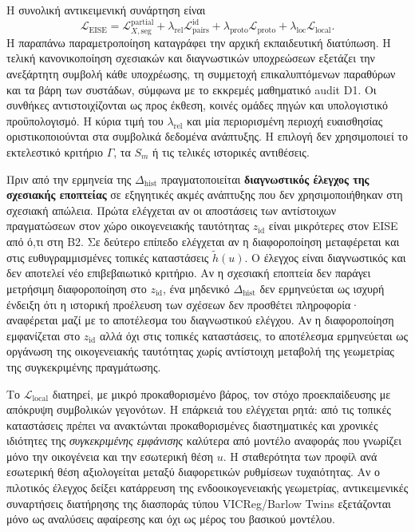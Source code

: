 \documentclass[11pt,a4paper]{article}
\begin{document}
Η συνολική αντικειμενική συνάρτηση είναι
\[
\mathcal L_{\mathrm{EISE}}
=\mathcal L_{X,\mathrm{seg}}^{\mathrm{partial}}
+\lambda_{\mathrm{rel}}\mathcal L_{\mathrm{pairs}}^{\mathrm{id}}
+\lambda_{\mathrm{proto}}\mathcal L_{\mathrm{proto}}
+\lambda_{\mathrm{loc}}\mathcal L_{\mathrm{local}}.
\]
Η παραπάνω παραμετροποίηση καταγράφει την αρχική εκπαιδευτική διατύπωση. Η τελική κανονικοποίηση σχεσιακών και διαγνωστικών υποχρεώσεων εξετάζει την ανεξάρτητη συμβολή κάθε υποχρέωσης, τη συμμετοχή επικαλυπτόμενων παραθύρων και τα βάρη των συστάδων, σύμφωνα με το εκκρεμές μαθηματικό audit D1. Οι συνθήκες αντιστοιχίζονται ως προς έκθεση, κοινές ομάδες πηγών και υπολογιστικό προϋπολογισμό. Η κύρια τιμή του $\lambda_{\mathrm{rel}}$ και μία περιορισμένη περιοχή ευαισθησίας οριστικοποιούνται στα συμβολικά δεδομένα ανάπτυξης. Η επιλογή δεν χρησιμοποιεί το εκτελεστικό κριτήριο $\Gamma$, τα $S_m$ ή τις τελικές ιστορικές αντιθέσεις.

Πριν από την ερμηνεία της $\Delta_{\mathrm{hist}}$ πραγματοποιείται \textbf{διαγνωστικός έλεγχος της σχεσιακής εποπτείας} σε εξηγητικές ακμές ανάπτυξης που δεν χρησιμοποιήθηκαν στη σχεσιακή απώλεια. Πρώτα ελέγχεται αν οι αποστάσεις των αντίστοιχων πραγματώσεων στον χώρο οικογενειακής ταυτότητας $z_{\mathrm{id}}$ είναι μικρότερες στον EISE από ό,τι στη B2. Σε δεύτερο επίπεδο ελέγχεται αν η διαφοροποίηση μεταφέρεται και στις ευθυγραμμισμένες τοπικές καταστάσεις $\widetilde h(u)$. Ο έλεγχος είναι διαγνωστικός και δεν αποτελεί νέο επιβεβαιωτικό κριτήριο. Αν η σχεσιακή εποπτεία δεν παράγει μετρήσιμη διαφοροποίηση στο $z_{\mathrm{id}}$, ένα μηδενικό $\Delta_{\mathrm{hist}}$ δεν ερμηνεύεται ως ισχυρή ένδειξη ότι η ιστορική προέλευση των σχέσεων δεν προσθέτει πληροφορία· αναφέρεται μαζί με το αποτέλεσμα του διαγνωστικού ελέγχου. Αν η διαφοροποίηση εμφανίζεται στο $z_{\mathrm{id}}$ αλλά όχι στις τοπικές καταστάσεις, το αποτέλεσμα ερμηνεύεται ως οργάνωση της οικογενειακής ταυτότητας χωρίς αντίστοιχη μεταβολή της γεωμετρίας της συγκεκριμένης πραγμάτωσης.

Το $\mathcal L_{\mathrm{local}}$ διατηρεί, με μικρό προκαθορισμένο βάρος, τον στόχο προεκπαίδευσης με απόκρυψη συμβολικών γεγονότων. Η επάρκειά του ελέγχεται ρητά: από τις τοπικές καταστάσεις πρέπει να ανακτώνται προκαθορισμένες διαστηματικές και χρονικές ιδιότητες της \emph{συγκεκριμένης εμφάνισης} καλύτερα από μοντέλο αναφοράς που γνωρίζει μόνο την οικογένεια και την εσωτερική θέση $u$. Η σταθερότητα των προφίλ ανά εσωτερική θέση αξιολογείται μεταξύ διαφορετικών ρυθμίσεων τυχαιότητας. Αν ο πιλοτικός έλεγχος δείξει κατάρρευση της ενδοοικογενειακής γεωμετρίας, αντικειμενικές συναρτήσεις διατήρησης της διασποράς τύπου VICReg/Barlow Twins εξετάζονται μόνο ως αναλύσεις αφαίρεσης και όχι ως μέρος του βασικού μοντέλου.
\end{document}
